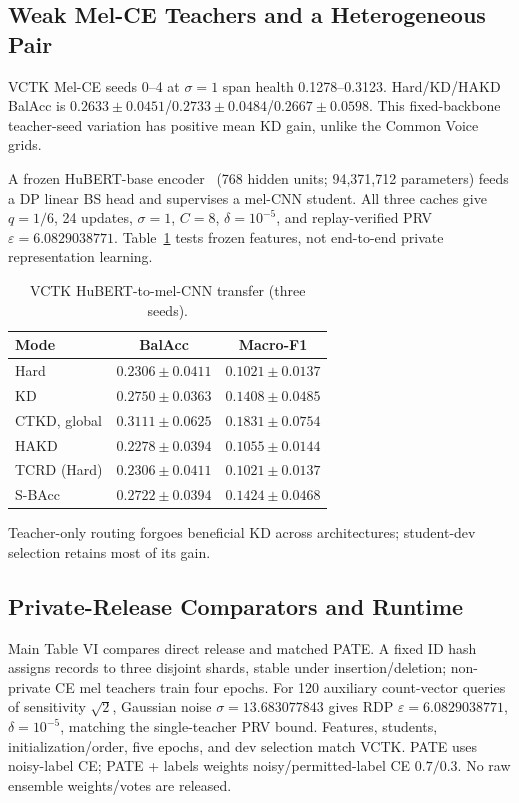 \documentclass[journal]{IEEEtran}
\begin{document}
\subsection{Weak Mel-CE Teachers and a Heterogeneous Pair}
VCTK Mel-CE seeds 0--4 at $\sigma=1$ span health 0.1278--0.3123. Hard/KD/HAKD BalAcc is $0.2633\pm0.0451$/$0.2733\pm0.0484$/$0.2667\pm0.0598$. This fixed-backbone teacher-seed variation has positive mean KD gain, unlike the Common Voice grids.

A frozen HuBERT-base encoder~\cite{hsu2021hubert} (768 hidden units; 94,371,712 parameters) feeds a DP linear BS head and supervises a mel-CNN student. All three caches give $q=1/6$, 24 updates, $\sigma=1$, $C=8$, $\delta=10^{-5}$, and replay-verified PRV $\varepsilon=6.0829038771$. Table~\ref{tab:hubert} tests frozen features, not end-to-end private representation learning.
\begin{table}[t]
\centering\footnotesize\setlength{\tabcolsep}{7pt}
\caption{VCTK HuBERT-to-mel-CNN transfer (three seeds).}
\label{tab:hubert}
\begin{tabular}{lcc}\toprule
Mode & BalAcc & Macro-F1\\\midrule
Hard & $0.2306\pm0.0411$ & $0.1021\pm0.0137$\\
KD & $0.2750\pm0.0363$ & $0.1408\pm0.0485$\\
CTKD, global & $0.3111\pm0.0625$ & $0.1831\pm0.0754$\\
HAKD & $0.2278\pm0.0394$ & $0.1055\pm0.0144$\\
TCRD (Hard) & $0.2306\pm0.0411$ & $0.1021\pm0.0137$\\
S-BAcc & $0.2722\pm0.0394$ & $0.1424\pm0.0468$\\\bottomrule
\end{tabular}
\end{table}
Teacher-only routing forgoes beneficial KD across architectures; student-dev selection retains most of its gain.

\subsection{Private-Release Comparators and Runtime}
Main Table VI compares direct release and matched PATE. A fixed ID hash assigns records to three disjoint shards, stable under insertion/deletion; non-private CE mel teachers train four epochs. For 120 auxiliary count-vector queries of sensitivity $\sqrt2$, Gaussian noise $\sigma=13.683077843$ gives RDP $\varepsilon=6.0829038771$, $\delta=10^{-5}$, matching the single-teacher PRV bound. Features, students, initialization/order, five epochs, and dev selection match VCTK. PATE uses noisy-label CE; PATE + labels weights noisy/permitted-label CE $0.7/0.3$. No raw ensemble weights/votes are released.
\end{document}
